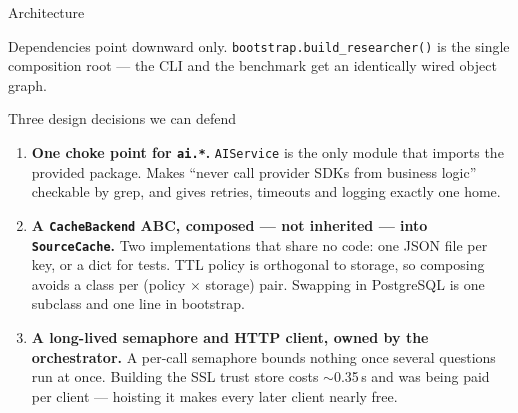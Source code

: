 \documentclass[aspectratio=169,11pt]{beamer}
\begin{document}
\begin{frame}{Architecture}
\begin{center}
  \end{center}

  \vspace{0.1em}
  {\footnotesize Dependencies point downward only. \texttt{bootstrap.build\_researcher()} is the
  single composition root --- the CLI and the benchmark get an identically wired object graph.}
\end{frame}

\begin{frame}{Three design decisions we can defend}
  \begin{enumerate}\setlength\itemsep{6pt}
    \item \textbf{One choke point for \texttt{ai.*}.} \texttt{AIService} is the only module that
    imports the provided package. Makes ``never call provider SDKs from business logic'' checkable
    by grep, and gives retries, timeouts and logging exactly one home.

    \item \textbf{A \texttt{CacheBackend} ABC, composed --- not inherited --- into
    \texttt{SourceCache}.} Two implementations that share no code: one JSON file per key, or a dict
    for tests. TTL policy is orthogonal to storage, so composing avoids a class per
    (policy $\times$ storage) pair. Swapping in PostgreSQL is one subclass and one line in bootstrap.

    \item \textbf{A long-lived semaphore and HTTP client, owned by the orchestrator.} A per-call
    semaphore bounds nothing once several questions run at once. Building the SSL trust store costs
    $\sim$0.35\,s and was being paid per client --- hoisting it makes every later client nearly free.
  \end{enumerate}
\end{frame}
\end{document}
